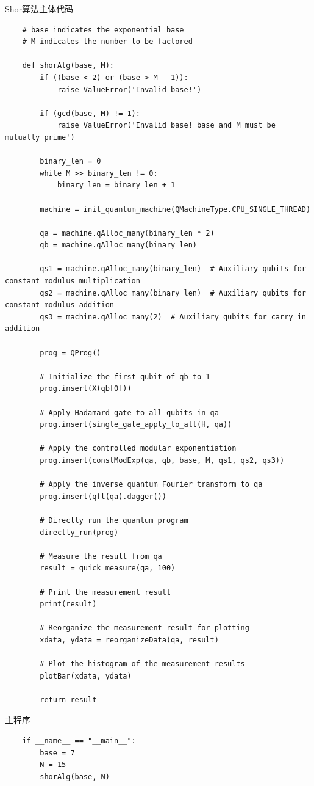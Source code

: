 \documentclass[12pt,hyperref,a4paper,UTF8]{ctexart}
\begin{document}
Shor算法主体代码
\begin{lstlisting}
    # base indicates the exponential base
    # M indicates the number to be factored

    def shorAlg(base, M):
        if ((base < 2) or (base > M - 1)):
            raise ValueError('Invalid base!')

        if (gcd(base, M) != 1):
            raise ValueError('Invalid base! base and M must be mutually prime')

        binary_len = 0
        while M >> binary_len != 0:
            binary_len = binary_len + 1

        machine = init_quantum_machine(QMachineType.CPU_SINGLE_THREAD)

        qa = machine.qAlloc_many(binary_len * 2)
        qb = machine.qAlloc_many(binary_len)

        qs1 = machine.qAlloc_many(binary_len)  # Auxiliary qubits for constant modulus multiplication
        qs2 = machine.qAlloc_many(binary_len)  # Auxiliary qubits for constant modulus addition
        qs3 = machine.qAlloc_many(2)  # Auxiliary qubits for carry in addition

        prog = QProg()

        # Initialize the first qubit of qb to 1
        prog.insert(X(qb[0]))

        # Apply Hadamard gate to all qubits in qa
        prog.insert(single_gate_apply_to_all(H, qa))

        # Apply the controlled modular exponentiation
        prog.insert(constModExp(qa, qb, base, M, qs1, qs2, qs3))

        # Apply the inverse quantum Fourier transform to qa
        prog.insert(qft(qa).dagger())

        # Directly run the quantum program
        directly_run(prog)

        # Measure the result from qa
        result = quick_measure(qa, 100)

        # Print the measurement result
        print(result)

        # Reorganize the measurement result for plotting
        xdata, ydata = reorganizeData(qa, result)

        # Plot the histogram of the measurement results
        plotBar(xdata, ydata)

        return result
\end{lstlisting}

主程序
\begin{lstlisting}
    if __name__ == "__main__":
        base = 7
        N = 15
        shorAlg(base, N)
\end{lstlisting}
\end{document}
